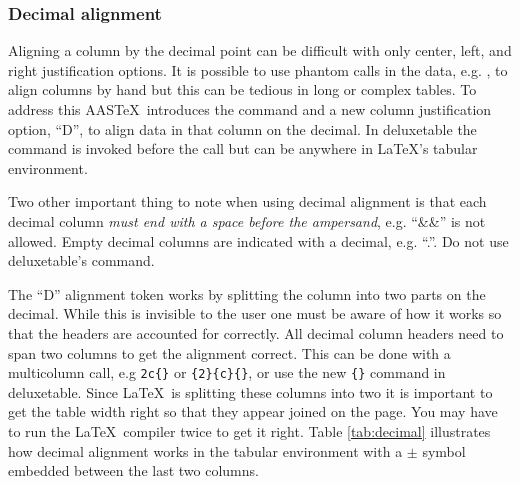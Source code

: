 \documentclass[preprint]{aastex62}
\newcommand\aastex{AAS\TeX}
\newcommand\latex{La\TeX}
\begin{document}
\subsubsection{Decimal alignment}

Aligning a column by the decimal point can be difficult with only center,
left, and right justification options.  It is possible to use phantom calls
in the data, e.g. {\tt\string\phn}, to align columns by hand but this can
be tedious in long or complex tables.  To address this \aastex\ introduces
the {\tt\string\decimals} command and a new column justification option,
``D'', to align data in that column on the decimal.  In deluxetable the
{\tt\string\decimals} command is invoked before the {\tt\string\startdata}
call but can be anywhere in \latex's tabular environment.  

Two other important thing to note when using decimal alignment is that each
decimal column \textit{must end with a space before the ampersand}, e.g.
``\&\&'' is not allowed.  Empty decimal columns are indicated with a decimal,
e.g. ``.''.  Do not use deluxetable's {\tt\string\nodata} command.

The ``D'' alignment token works by splitting the column into two parts on the
decimal.  While this is invisible to the user one must be aware of how it
works so that the headers are accounted for correctly.  All decimal column
headers need to span two columns to get the alignment correct. This can be
done with a multicolumn call, e.g {\tt\string\multicolumn2c\{\}} or
{\tt\string\multicolumn\{2\}\{c\}\{\}}, or use the new
{\tt\string\twocolhead\{\}} command in deluxetable.  Since \latex\ is
splitting these columns into two it is important to get the table width
right so that they appear joined on the page.  You may have to run the
\latex\ compiler twice to get it right.  Table \ref{tab:decimal}
illustrates how decimal alignment works in the tabular environment with a
$\pm$ symbol embedded between the last two columns.
\end{document}
